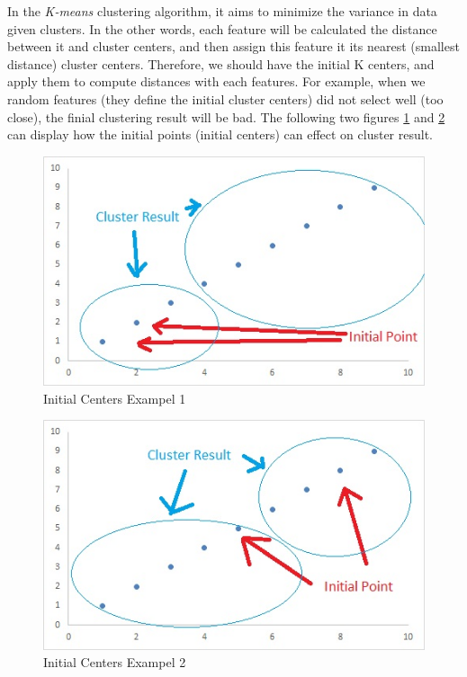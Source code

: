 \documentclass[12pt]{article}
\begin{document}
In the \textit{K-means} clustering algorithm, it aims to minimize the variance in data given clusters. In the other words, each feature will be calculated the distance between it and cluster centers, and then assign this feature it its nearest (smallest distance) cluster centers. Therefore, we should have the initial K centers, and apply them to compute distances with each features. For example, when we random features (they define the initial cluster centers) did not select well (too close), the finial clustering result will be bad. The following two figures \ref{fig:initialExample1} and \ref{fig:initialExample2} can display how the initial points (initial centers) can effect on cluster result.

\begin{figure}[h]
    \centering
    \includegraphics[width=1\textwidth]{initialExample1.jpg}
    \caption{Initial Centers Exampel 1}
    \label{fig:initialExample1}
\end{figure}

\begin{figure}[h]
    \centering
    \includegraphics[width=1\textwidth]{initialExample2.jpg}
    \caption{Initial Centers Exampel 2}
    \label{fig:initialExample2}
\end{figure}
\end{document}
